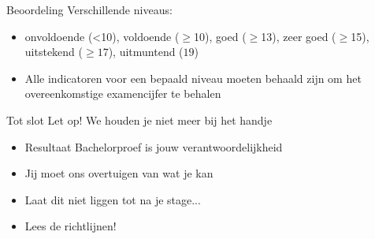 \documentclass{beamer}
\begin{document}
\begin{frame}{Beoordeling}
	Verschillende niveaus:
	\begin{itemize}
		\item onvoldoende (<10), voldoende ($\geq$10), goed ($\geq$13), zeer goed
		($\geq$15), uitstekend ($\geq17$), uitmuntend ($19$)
		\item Alle indicatoren voor een bepaald niveau moeten behaald
		zijn om het overeenkomstige examencijfer te behalen
	\end{itemize}

\end{frame}

\begin{frame}{Tot slot}
	Let op! We houden je niet meer bij het handje
	\begin{itemize}
	\item Resultaat Bachelorproef is jouw verantwoordelijkheid
	\item Jij moet ons overtuigen van wat je kan
	\item Laat dit niet liggen tot na je stage...
	\item Lees de richtlijnen!
		\end{itemize}
\end{frame}
\end{document}
